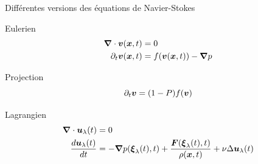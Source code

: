 \begin{frame}[<+->]{Différentes versions des équations de Navier-Stokes}
 \setlength{\abovedisplayskip}{0pt}
 \setlength{\abovedisplayshortskip}{0pt}
 \begin{block}{Eulerien}
 \begin{align*}
  {\boldsymbol {\nabla}} \cdot {\boldsymbol {v}}({\boldsymbol {x}} ,t)&=0\\
\partial_t {\boldsymbol {v}}({\boldsymbol {x}} ,t)&=f({\boldsymbol {v}}({\boldsymbol {x}},t))-{\boldsymbol {\nabla}}p
\end{align*}
 \end{block}
 \begin{block}{Projection}
 \begin{equation*}
  \partial_t {\boldsymbol {v}}=(1-P)f({\boldsymbol {v}})
  \end{equation*}
 \end{block}

 \begin{block}{Lagrangien}
  \begin{align*}
{\boldsymbol {\nabla}} \cdot {\boldsymbol {u}}_{\lambda}(t)&=0\\
\frac{d {\boldsymbol {u}}_{\lambda}(t)}{d t}&=-{\boldsymbol {\nabla}} p({\boldsymbol {\xi}}_{\lambda}(t),t)+\frac{{\boldsymbol {F}}({\boldsymbol {\xi}}_{\lambda}(t),t)}{\rho({\boldsymbol {x}},t)}+\nu \Delta {\boldsymbol {u}}_{\lambda}(t)
 \end{align*}
 \end{block}


\end{frame}

